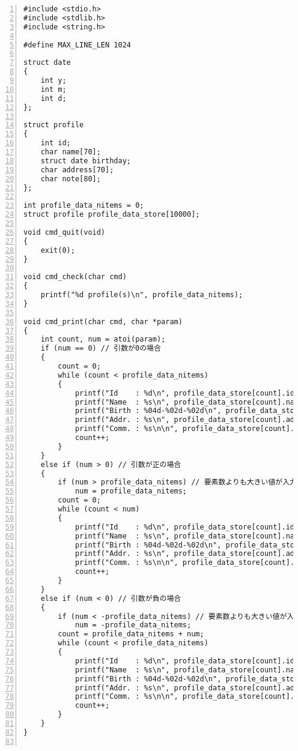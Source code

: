 \documentclass[autodetect-engine,dvi=dvipdfmx,ja=standard,
               a4j,11pt]{bxjsarticle}
\begin{document}
\begin{Verbatim}[numbers=left, xleftmargin=10mm, numbersep=6pt,
    fontsize=\small, baselinestretch=0.8]
#include <stdio.h>
#include <stdlib.h>
#include <string.h>

#define MAX_LINE_LEN 1024

struct date
{
    int y;
    int m;
    int d;
};

struct profile
{
    int id;
    char name[70];
    struct date birthday;
    char address[70];
    char note[80];
};

int profile_data_nitems = 0;
struct profile profile_data_store[10000];

void cmd_quit(void)
{
    exit(0);
}

void cmd_check(char cmd)
{
    printf("%d profile(s)\n", profile_data_nitems);
}

void cmd_print(char cmd, char *param)
{
    int count, num = atoi(param);
    if (num == 0) // 引数が0の場合
    {
        count = 0;
        while (count < profile_data_nitems)
        {
            printf("Id    : %d\n", profile_data_store[count].id);
            printf("Name  : %s\n", profile_data_store[count].name);
            printf("Birth : %04d-%02d-%02d\n", profile_data_store[count].birthday.y, profile_data_store[count].birthday.m, profile_data_store[count].birthday.d);
            printf("Addr. : %s\n", profile_data_store[count].address);
            printf("Comm. : %s\n\n", profile_data_store[count].note);
            count++;
        }
    }
    else if (num > 0) // 引数が正の場合
    {
        if (num > profile_data_nitems) // 要素数よりも大きい値が入力された場合
            num = profile_data_nitems;
        count = 0;
        while (count < num)
        {
            printf("Id    : %d\n", profile_data_store[count].id);
            printf("Name  : %s\n", profile_data_store[count].name);
            printf("Birth : %04d-%02d-%02d\n", profile_data_store[count].birthday.y, profile_data_store[count].birthday.m, profile_data_store[count].birthday.d);
            printf("Addr. : %s\n", profile_data_store[count].address);
            printf("Comm. : %s\n\n", profile_data_store[count].note);
            count++;
        }
    }
    else if (num < 0) // 引数が負の場合
    {
        if (num < -profile_data_nitems) // 要素数よりも大きい値が入力された場合
            num = -profile_data_nitems;
        count = profile_data_nitems + num;
        while (count < profile_data_nitems)
        {
            printf("Id    : %d\n", profile_data_store[count].id);
            printf("Name  : %s\n", profile_data_store[count].name);
            printf("Birth : %04d-%02d-%02d\n", profile_data_store[count].birthday.y, profile_data_store[count].birthday.m, profile_data_store[count].birthday.d);
            printf("Addr. : %s\n", profile_data_store[count].address);
            printf("Comm. : %s\n\n", profile_data_store[count].note);
            count++;
        }
    }
}


\end{Verbatim}
\end{document}
